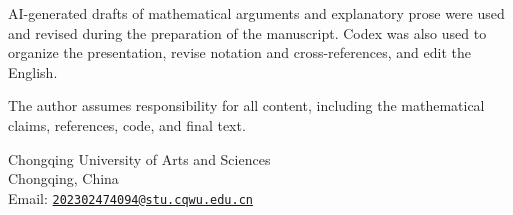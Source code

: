 \documentclass[11pt]{article}
\numberwithin{equation}{section}
\theoremstyle{definition}
\theoremstyle{remark}
\begin{document}
AI-generated drafts of mathematical arguments and explanatory prose were
used and revised during the preparation of the manuscript. Codex was also used to organize the presentation, revise notation and
cross-references, and edit the English.

The author assumes responsibility for all content, including the
mathematical claims, references, code, and final text.

{\raggedright


}

\bigskip
\noindent\begin{minipage}{\textwidth}
\small
Chongqing University of Arts and Sciences\\
Chongqing, China\\
Email: \href{mailto:202302474094@stu.cqwu.edu.cn}{\texttt{202302474094@stu.cqwu.edu.cn}}
\end{minipage}
\end{document}
